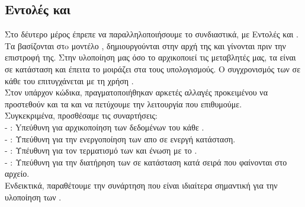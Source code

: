 \documentclass{article}
\begin{document}

\subsection{ Εντολές και  }

Στο δέυτερο μέρος έπρεπε να παραλληλοποιήσουμε το  συνδιαστικά, με  Εντολές και . Τα  βασίζονται στo μοντέλο  , δημιουργούνται στην αρχή της  και γίνονται  πριν την επιστροφή της. Στην υλοποίηση μας όσο το  αρχικοποιεί τις μεταβλητές μας, τα  είναι σε κατάσταση  και έπειτα  το  μοιράζει στα  τους υπολογισμούς. Ο συγχρονισμός των  σε κάθε  του  επιτυγχάνεται με τη χρήση .\\

Στον υπάρχον κώδικα, πραγματοποιήθηκαν αρκετές αλλαγές προκειμένου να προστεθούν και τα  και να πετύχουμε την λειτουργία που επιθυμούμε.\\ 
\vspace{5mm}
Συγκεκριμένα, προσθέσαμε τις συναρτήσεις:\\
- : Yπεύθυνη για αρχικοποίηση των δεδομένων του κάθε .\\
- : Υπεύθυνη για την ενεργοποίηση των  απο  σε ενεργή κατάσταση.\\
- : Υπέυθυνη για τον τερματισμό των  και ένωση με το .\\
- : Υπεύθυνη για την διατήρηση των  σε  κατάσταση κατά σειρά που φαίνονται στο αρχείο.\\

Ενδεικτικά, παραθέτουμε την συνάρτηση  που είναι ιδιαίτερα σημαντική για την υλοποίηση των .\\
\end{document}
